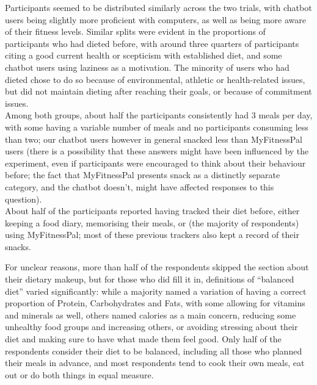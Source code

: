 Participants seemed to be distributed similarly across the two trials, with chatbot users being slightly more proficient with computers, as well as being more aware of their fitness levels. Similar splits were evident in the proportions of participants who had dieted before, with around three quarters of participants citing a good current health or scepticism with established diet, and some chatbot users using laziness as a motivation. The minority of users who had dieted chose to do so because of environmental, athletic or health-related issues, but did not maintain dieting after reaching their goals, or because of commitment issues. \\
Among both groups, about half the participants consistently had 3 meals per day, with some having a variable number of meals and no participants consuming less than two; our chatbot users however in general snacked less than MyFitnessPal users (there is a possibility that these answers might have been influenced by the experiment, even if participants were encouraged to think about their behaviour before; the fact that MyFitnessPal presents snack as a distinctly separate category, and the chatbot doesn't, might have affected responses to this question). \\
About half of the participants reported having tracked their diet before, either keeping a food diary, memorising their meals, or (the majority of respondents) using MyFitnessPal; most of these previous trackers also kept a record of their snacks. 

For unclear reasons, more than half of the respondents skipped the section about their dietary makeup, but for those who did fill it in, definitions of ``balanced diet'' varied significantly: while a majority named a variation of having a correct proportion of Protein, Carbohydrates and Fats, with some allowing for vitamins and minerals as well, others named calories as a main concern, reducing some unhealthy food groups and increasing others, or avoiding stressing about their diet and making sure to have what made them feel good. Only half of the respondents consider their diet to be balanced, including all those who planned their meals in advance, and most respondents tend to cook their own meals, eat out or do both things in equal measure.

